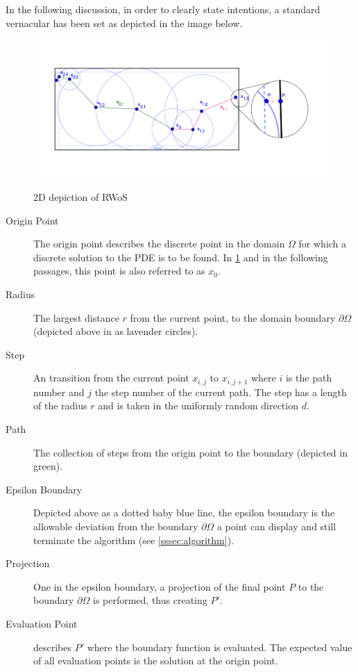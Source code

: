 In the following discussion, in order to clearly state intentions, a standard
vernacular has been set as depicted in the image below.

\begin{figure}
\includegraphics[width=15.0cm]{styles/WoS} \label{diagram}
  \caption{2D depiction of \Gls{RWoS}}
\end{figure}

\begin{description}
\item[Origin Point] The origin point describes the discrete point in the domain
$\Omega$ for which a discrete solution to the PDE is to be found. In \ref{diagram}
and in the following passages, this point is also referred to as $x_{0}$.
\item[Radius] The largest distance $r$ from the current point, to the domain boundary
$\partial\Omega$ (depicted above in as lavender circles).
\item[Step] An transition from the current point $x_{i,j}$ to $x_{i,j+1}$ where
$i$ is the path number and $j$ the step number of the current path.  The step has
a length of the radius $r$ and is taken in the uniformly random direction $d$.
\item[Path] The collection of steps from the origin point to the boundary (depicted in green).
\item[Epsilon Boundary] Depicted above as a dotted baby blue line, the epsilon boundary
is the allowable deviation from the boundary $\partial\Omega$ a point can display
and still terminate the algorithm (see \ref{sssec:algorithm}).
\item[Projection] One in the epsilon boundary, a projection of the final point $P$
to the boundary $\partial\Omega$ is performed, thus creating $P'$.
\item[Evaluation Point] describes $P'$ where the boundary function is evaluated.
The expected value of all evaluation points is the solution at the origin point.
\end{description}

